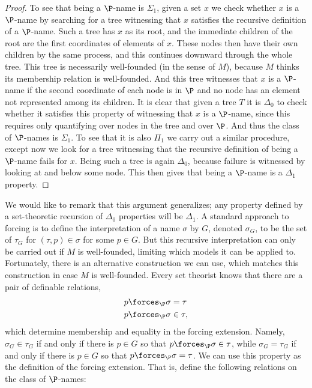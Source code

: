 \documentclass{amsart}
\begin{document}
\begin{proof}
To see that being a $\P$-name is $\Sigma_1$, given a set $x$ we check whether $x$ is a $\P$-name by searching for a tree witnessing that $x$ satisfies the recursive definition of a $\P$-name. Such a tree has $x$ as its root, and the immediate children of the root are the first coordinates of elements of $x$. These nodes then have their own children by the same process, and this continues downward through the whole tree. This tree is necessarily well-founded (in the sense of $M$), because $M$ thinks its membership relation is well-founded. And this tree witnesses that $x$ is a $\P$-name if the second coordinate of each node is in $\P$ and no node has an element not represented among its children. It is clear that given a tree $T$ it is $\Delta_0$ to check whether it satisfies this property of witnessing that $x$ is a $\P$-name, since this requires only quantifying over nodes in the tree and over $\P$. And thus the class of $\P$-names is $\Sigma_1$.
To see that it is also $\Pi_1$ we carry out a similar procedure, except now we look for a tree witnessing that the recursive definition of being a $\P$-name fails for $x$. Being such a tree is again $\Delta_0$, because failure is witnessed by looking at and below some node. This then gives that being a $\P$-name is a $\Delta_1$ property.
\end{proof}
We would like to remark that this argument generalizes; any property defined by a set-theoretic recursion of $\Delta_0$ properties will be $\Delta_1$.
\smallskip
A standard approach to forcing is to define the interpretation of a name $\sigma$ by $G$, denoted $\sigma_G$, to be the set of $\tau_G$ for $(\tau,p) \in \sigma$ for some $p \in G$. But this recursive interpretation can only be carried out if $M$ is well-founded, limiting which models it can be applied to. Fortunately, there is an alternative construction we can use, which matches this construction in case $M$ is well-founded.
Every set theorist knows that there are a pair of definable relations,
\begin{align*}
p &\forces_\P \sigma = \tau \\ p &\forces_\P \sigma \in \tau,
\end{align*}
which determine membership and equality in the forcing extension. Namely, $\sigma_G \in \tau_G$ if and only if there is $p \in G$ so that $p \forces_\P \sigma \in \tau$, while $\sigma_G = \tau_G$ if and only if there is $p \in G$ so that $p \forces_\P \sigma = \tau$.
We can use this property as the definition of the forcing extension. That is, define the following relations on the class of $\P$-names:
\end{document}
